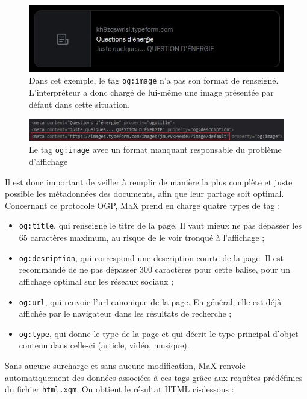 \documentclass[a4paper,12pt,twoside]{book}
\begin{document}
\begin{figure}[H]
    \centering
    \includegraphics[width=12cm]{img/partie_2/poitiers.JPG}
    \caption{Dans cet exemple, le tag \texttt{og:image} n'a pas son format de renseigné. L'interpréteur a donc chargé de lui-même une image présentée par défaut dans cette situation.}
    \label{bad_figure}
\end{figure}

\begin{figure}[H]
    \centering
    \includegraphics[width=12cm]{img/partie_2/og_image_bad.JPG}
    \caption{Le tag \texttt{og:image} avec un format manquant responsable du problème d'affichage}
    \label{tag_og}
\end{figure}


Il est donc important de veiller à remplir de manière la plus complète et juste possible les métadonnées des documents, afin que leur partage soit optimal.
Concernant ce protocole \acrshort{OGP}, MaX prend en charge quatre types de tag :

\begin{itemize}
    \item \texttt{og:title}, qui renseigne le titre de la page. Il vaut mieux ne pas dépasser les 65 caractères maximum, au risque de le voir tronqué à l'affichage ;
    \item \texttt{og:desription}, qui correspond une description courte de la page. Il est recommandé de ne pas dépasser 300 caractères pour cette balise, pour un affichage optimal sur les réseaux sociaux ;
    \item \texttt{og:url}, qui renvoie l'url canonique de la page. En général, elle est déjà affichée par le navigateur dans les résultats de recherche ;
    \item \texttt{og:type}, qui donne le type de la page et qui décrit le type principal d'objet contenu dans celle-ci (article, vidéo, musique).
\end{itemize}

Sans aucune surcharge et sans aucune modification, MaX renvoie automatiquement des données associées à ces tags grâce aux requêtes prédéfinies du fichier \texttt{html.xqm}. On obtient le résultat \acrshort{HTML} ci-dessous :
\end{document}
